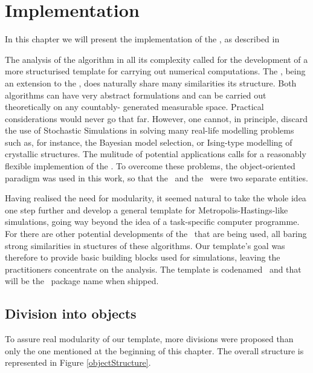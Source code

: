 \documentclass{book}
\begin{document}
\chapter{ Implementation }\label{Implementation}

In this chapter we will present the implementation of the \PT, as described in 

The analysis of the algorithm in all its complexity called for the development
of a more structurised template for carrying out numerical computations. The
\PT, being an extension to the \MH, does naturally share many similarities its structure. Both algorithms can have very
abstract formulations and can be carried out theoretically on any countably-
generated measurable space. Practical considerations would never go that far.
However, one cannot, in principle, discard the use of Stochastic Simulations in solving many real-life modelling problems such as, for instance, the Bayesian model selection, or Ising-type modelling of crystallic structures. The mulitude of potential applications calls for a reasonably flexible implemention of the \PT. To overcome these problems, the object-oriented paradigm was used in this work, so that the \sspace\, and the \algo\, were two separate entities. 

Having realised the need for modularity, it seemed natural to take the whole idea one step further and develop a general template for Metropolis-Hastings-like simulations, going way beyond the idea of a task-specific computer programme. For there are other potential developments of the \MH\, that are being used, all baring strong similarities in stuctures of these algorithms. Our template's goal was therefore to provide basic building blocks used for simulations, leaving the practitioners concentrate on the analysis. The template is codenamed \ssimul \, and that will be the \RR\, package name when shipped.

\section{Division into objects}

To assure real modularity of our template, more divisions were proposed than only the one mentioned at the beginning of this chapter. The overall structure is represented in Figure \ref{objectStructure}.
\end{document}
